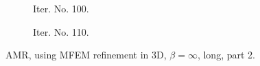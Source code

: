 \documentclass[a4paper,12pt]{amsart}
\numberwithin{equation}{section}
\begin{document}
\begin{figure}[h!]
\begin{subfigure}[t]{0.49\textwidth}
    \caption{Iter. No. 100.}
\end{subfigure}
	\hfill
\begin{subfigure}[t]{0.49\textwidth}
    \caption{Iter. No. 110.}
\end{subfigure}

\caption{AMR, using MFEM refinement in 3D, $\beta = \infty$, long, part 2.}
\label{fig:amr_trans3D_paraview_mfem_longrun_part2}
\end{figure}
\end{document}
